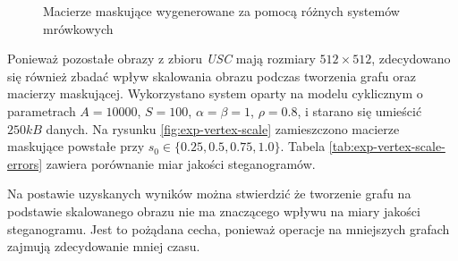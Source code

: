 {{{\begin{figure}
                \caption[Porównania wizualizacji konwersji oraz macierzy maskujących.]
                {Macierze maskujące wygenerowane za pomocą różnych systemów mrówkowych}
                \label{fig:exp-vertex-pher}
            \end{figure}

            Ponieważ pozostałe obrazy z zbioru \textit{USC} mają rozmiary $512 \times 512$, zdecydowano się również
            zbadać wpływ skalowania obrazu podczas tworzenia grafu oraz macierzy maskującej. Wykorzystano system oparty
            na modelu cyklicznym o parametrach $A=10000$, $S=100$, $\alpha=\beta=1$, $\rho=0.8$, i starano się umieścić
            $250kB$ danych. Na rysunku \ref{fig:exp-vertex-scale} zamieszczono macierze maskujące powstałe przy $s_0 \in
            \{0.25, 0.5, 0.75, 1.0\}$. Tabela \ref{tab:exp-vertex-scale-errors} zawiera porównanie miar jakości
            steganogramów.

            Na postawie uzyskanych wyników można stwierdzić że tworzenie grafu na podstawie skalowanego obrazu nie ma
            znaczącego wpływu na miary jakości steganogramu. Jest to pożądana cecha, ponieważ operacje na mniejszych
            grafach zajmują zdecydowanie mniej czasu.

}}}
